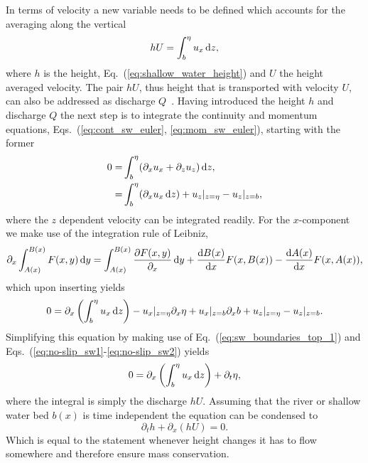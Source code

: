 In terms of velocity a new variable needs to be defined which accounts for the averaging along the vertical
\begin{equation}\label{eq:sw_discharge}
    hU = \int_{b}^{\eta}u_x\mathop{}\!\mathrm{d} z,
\end{equation}
where $h$ is the height, Eq.~(\ref{eq:shallow_water_height}) and $U$ the height averaged velocity. 
The pair $hU$, thus height that is transported with velocity $U$, can also be addressed as discharge $Q$~\cite{Salmon:1999:0022-2402:503}.
Having introduced the height $h$ and discharge $Q$ the next step is to integrate the continuity and momentum equations, Eqs.~(\ref{eq:cont_sw_euler}, \ref{eq:mom_sw_euler}), starting with the former
\begin{align}
    0 =& \int_b^{\eta} (\partial_x u_x + \partial_z u_z) \mathop{}\!\mathrm{d} z, \label{eq:vert_int_cont_1}\\
    =& \int_b^{\eta} (\partial_x u_x \mathop{}\!\mathrm{d} z) + u_z|_{z = \eta} - u_z|_{z = b}, \label{eq:vert_int_cont_2}
\end{align}
 where the $z$ dependent velocity can be integrated readily. 
 For the $x$-component we make use of the integration rule of Leibniz, 
\begin{equation}\label{eq:int_leibniz}
    \partial_x\int_{A(x)}^{B(x)}F(x,y)\mathop{}\!\mathrm{d} y = \int_{A(x)}^{B(x)}\frac{\partial F(x,y)}{\partial_x} \mathop{}\!\mathrm{d} y + \frac{\mathop{}\!\mathrm{d} B(x)}{\mathop{}\!\mathrm{d} x}F(x,B(x)) - \frac{\mathop{}\!\mathrm{d} A(x)}{\mathop{}\!\mathrm{d} x} F(x, A(x)),
\end{equation}
which upon inserting yields
\begin{equation}\label{eq:vert_int_cont_3}
    0 = \partial_x\left(\int_{b}^{\eta} u_x \mathop{}\!\mathrm{d} z \right) - u_x|_{z=\eta}\partial_x\eta + u_x|_{z=b}\partial_x b + u_z|_{z = \eta}  - u_z|_{z = b}. 
\end{equation}
Simplifying this equation by making use of Eq.~(\ref{eq:sw_boundaries_top_1}) and Eqs.~(\ref{eq:no-slip_sw1}-\ref{eq:no-slip_sw2}) yields
\begin{equation}\label{eq:vert_int_cont_4}
    0 = \partial_x\left(\int_{b}^{\eta} u_x \mathop{}\!\mathrm{d} z \right) + \partial_t \eta,
\end{equation}
where the integral is simply the discharge $hU$. 
Assuming that the river or shallow water bed $b(x)$ is time independent the equation can be condensed to
\begin{equation}\label{eq:shallow_water_cont_true}
    \partial_t h + \partial_x(hU) = 0.
\end{equation}
Which is equal to the statement whenever height changes it has to flow somewhere and therefore ensure mass conservation. 

